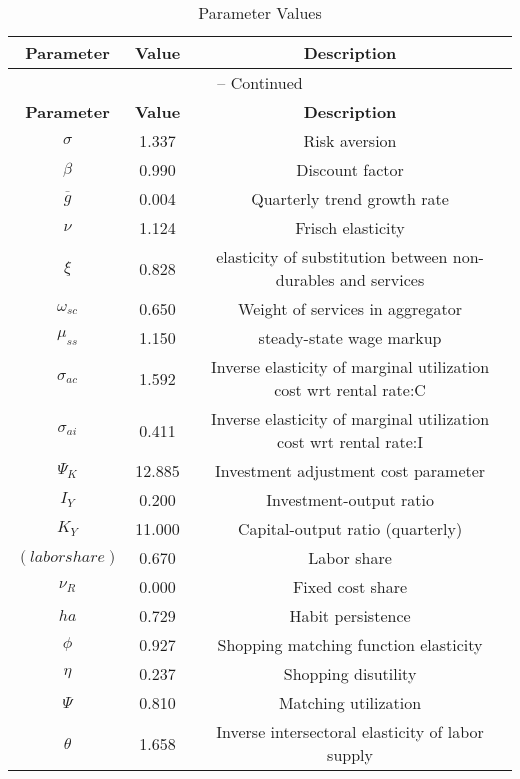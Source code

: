 \begin{center}
\begin{longtable}{ccc}
\caption{Parameter Values}\\%
\toprule%
\multicolumn{1}{c}{\textbf{Parameter}} &
\multicolumn{1}{c}{\textbf{Value}} &
 \multicolumn{1}{c}{\textbf{Description}}\\%
\midrule%
\endfirsthead
\multicolumn{3}{c}{{\tablename} \thetable{} -- Continued}\\%
\midrule%
\multicolumn{1}{c}{\textbf{Parameter}} &
\multicolumn{1}{c}{\textbf{Value}} &
  \multicolumn{1}{c}{\textbf{Description}}\\%
\midrule%
\endhead
${\sigma}$ 	 & 	 1.337 	 & 	 Risk aversion\\
${\beta}$ 	 & 	 0.990 	 & 	 Discount factor\\
${\overline{g}}$ 	 & 	 0.004 	 & 	 Quarterly trend growth rate\\
$\nu$ 	 & 	 1.124 	 & 	 Frisch elasticity\\
$\xi$ 	 & 	 0.828 	 & 	 elasticity of substitution between non-durables and services\\
$\omega_{sc}$ 	 & 	 0.650 	 & 	 Weight of services in aggregator\\
$\mu_{ss}$ 	 & 	 1.150 	 & 	 steady-state wage markup\\
${\sigma_{ac}}$ 	 & 	 1.592 	 & 	 Inverse elasticity of marginal utilization cost wrt rental rate:C\\
${\sigma_{ai}}$ 	 & 	 0.411 	 & 	 Inverse elasticity of marginal utilization cost wrt rental rate:I\\
${\Psi_{K}}$ 	 & 	 12.885 	 & 	 Investment adjustment cost parameter\\
${I_Y}$ 	 & 	 0.200 	 & 	 Investment-output ratio\\
${K_Y}$ 	 & 	 11.000 	 & 	 Capital-output ratio (quarterly)\\
$(labor share)$ 	 & 	 0.670 	 & 	 Labor share\\
${\nu_R}$ 	 & 	 0.000 	 & 	 Fixed cost share\\
${ha}$ 	 & 	 0.729 	 & 	 Habit persistence\\
${\phi}$ 	 & 	 0.927 	 & 	 Shopping matching function elasticity\\
${\eta}$ 	 & 	 0.237 	 & 	 Shopping disutility\\
${\Psi}$ 	 & 	 0.810 	 & 	 Matching utilization\\
${\theta}$ 	 & 	 1.658 	 & 	 Inverse intersectoral elasticity of labor supply\\

\end{longtable}
\end{center}
